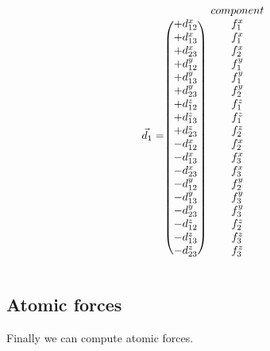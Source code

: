 \begin{equation}
\vec{d}_{1} = \begin{blockarray}{cc}
              & component \\
\begin{block}{(c)c}
	+d^x_{12} & f^x_1 \\
	+d^x_{13} & f^x_1 \\
	+d^x_{23} & f^x_2 \\
	+d^y_{12} & f^y_1 \\
	+d^y_{13} & f^y_1 \\
	+d^y_{23} & f^y_2 \\
	+d^z_{12} & f^z_1 \\
	+d^z_{13} & f^z_1 \\
	+d^z_{23} & f^z_2 \\
	-d^x_{12} & f^x_2 \\
	-d^x_{13} & f^x_3 \\
	-d^x_{23} & f^x_3 \\
	-d^y_{12} & f^y_2 \\
	-d^y_{13} & f^y_3 \\
	-d^y_{23} & f^y_3 \\
	-d^z_{12} & f^z_2 \\
	-d^z_{13} & f^z_3 \\
	-d^z_{23} & f^z_3 \\
\end{block}
\end{blockarray}
\end{equation}

\subsection{Atomic forces}

Finally we can compute atomic forces.
